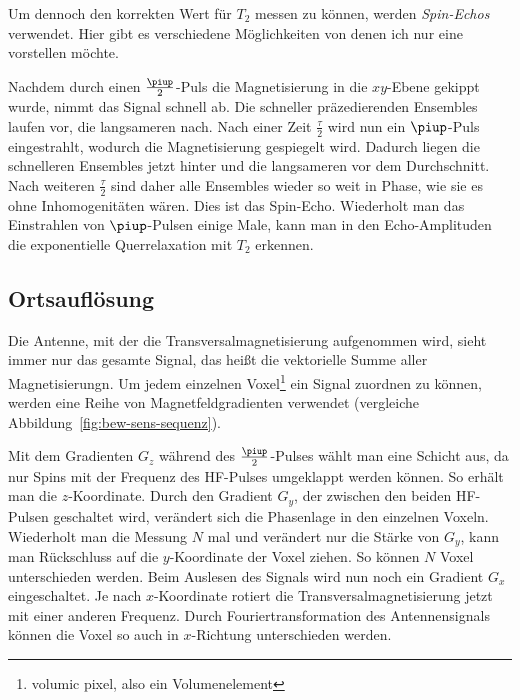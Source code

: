 \documentclass[
    11pt,
    ngerman
]{scrbook}
\begin{document}
Um dennoch den korrekten Wert für $T_2$ messen zu können, werden
\emph{Spin-Echos} verwendet. Hier gibt es verschiedene Möglichkeiten von denen
ich nur eine vorstellen möchte.

Nachdem durch einen $\frac\piup2$-Puls die Magnetisierung in die $xy$-Ebene
gekippt wurde, nimmt das Signal schnell ab. Die schneller präzedierenden
Ensembles laufen vor, die langsameren nach. Nach einer Zeit $\frac\tau2$ wird
nun ein $\piup$-Puls eingestrahlt, wodurch die Magnetisierung gespiegelt wird.
Dadurch liegen die schnelleren Ensembles jetzt hinter und die langsameren vor
dem Durchschnitt. Nach weiteren $\frac\tau2$ sind daher alle Ensembles wieder
so weit in Phase, wie sie es ohne Inhomogenitäten wären. Dies ist das
Spin-Echo. Wiederholt man das Einstrahlen von $\piup$-Pulsen einige Male, kann
man in den Echo-Amplituden die exponentielle Querrelaxation mit $T_2$ erkennen.

\subsection{Ortsauflösung}

Die Antenne, mit der die Transversalmagnetisierung aufgenommen wird, sieht
immer nur das gesamte Signal, das heißt die vektorielle Summe aller
Magnetisierungn. Um jedem einzelnen Voxel\footnote{volumic pixel, also ein
Volumenelement} ein Signal zuordnen zu können, werden eine Reihe von
Magnetfeldgradienten verwendet (vergleiche
Abbildung~\ref{fig:bew-sens-sequenz}).

Mit dem Gradienten $G_z$ während des $\frac\piup2$-Pulses wählt man eine
Schicht aus, da nur Spins mit der Frequenz des HF-Pulses umgeklappt werden
können. So erhält man die $z$-Koordinate. Durch den Gradient $G_y$,
der zwischen den beiden HF-Pulsen geschaltet wird, verändert sich die
Phasenlage in den einzelnen Voxeln. Wiederholt man die Messung $N$ mal und
verändert nur die Stärke von $G_y$, kann man Rückschluss auf die $y$-Koordinate
der Voxel ziehen. So können $N$ Voxel unterschieden werden. Beim Auslesen des
Signals wird nun noch ein Gradient $G_x$ eingeschaltet. Je nach $x$-Koordinate
rotiert die Transversalmagnetisierung jetzt mit einer anderen Frequenz. Durch
Fouriertransformation des Antennensignals können die Voxel so auch in
$x$-Richtung unterschieden werden.
\end{document}
